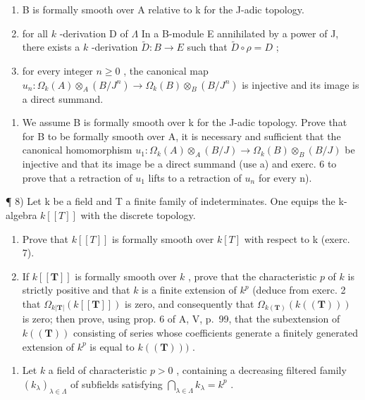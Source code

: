 \begin{enumerate}
\def\labelenumi{(\roman{enumi})}
\item
  B is formally smooth over A relative to k for the J-adic topology.
\item
  for all \(k\) -derivation D of \(\Lambda\) In a B-module E annihilated by a power of J, there exists a \(k\) -derivation \(\tilde{D}: B \to E\) such that \(\tilde{D} \circ \rho = D\) ;
\item
  for every integer \(n \geqslant 0\) , the canonical map \(u_n: \Omega_k(A) \otimes_A (B/J^n) \longrightarrow \Omega_k(B) \otimes_B (B/J^n)\) is injective and its image is a direct summand.
\end{enumerate}

\begin{enumerate}
\def\labelenumi{\alph{enumi})}
\setcounter{enumi}{1}
\tightlist
\item
  We assume B is formally smooth over k for the J-adic topology. Prove that for B to be formally smooth over A, it is necessary and sufficient that the canonical homomorphism \(u_{1}:\Omega_{k}(A)\otimes_{A}(B/J)\to\Omega_{k}(B)\otimes_{B}(B/J)\) be injective and that its image be a direct summand (use a) and exerc. 6 to prove that a retraction of \(u_{1}\) lifts to a retraction of \(u_{n}\) for every n).
\end{enumerate}

¶ 8) Let k be a field and T a finite family of indeterminates. One equips the k-algebra \(k[[T]]\) with the discrete topology.

\begin{enumerate}
\def\labelenumi{\alph{enumi})}
\item
  Prove that \(k[[T]]\) is formally smooth over \(k[T]\) with respect to k (exerc. 7).
\item
  If \(k[[\mathbf{T}]]\) is formally smooth over \(k\) , prove that the characteristic \(p\) of \(k\) is strictly positive and that \(k\) is a finite extension of \(k^p\) (deduce from exerc. 2 that \(\Omega_{k|\mathbf{T}|}(k[[\mathbf{T}]])\) is zero, and consequently that \(\Omega_{k(\mathbf{T})}(k((\mathbf{T})))\) is zero; then prove, using prop. 6 of A, V, p.~99, that the subextension of \(k((\mathbf{T}))\) consisting of series whose coefficients generate a finitely generated extension of \(k^p\) is equal to \(k((\mathbf{T})))\) .
\end{enumerate}

\begin{enumerate}
\def\labelenumi{\arabic{enumi})}
\setcounter{enumi}{8}
\tightlist
\item
  Let \(k\) a field of characteristic \(p > 0\) , containing a decreasing filtered family \((k_{\lambda})_{\lambda \in \Lambda}\) of subfields satisfying \(\bigcap_{\lambda \in \Lambda} k_{\lambda} = k^{p}\) .
\end{enumerate}

